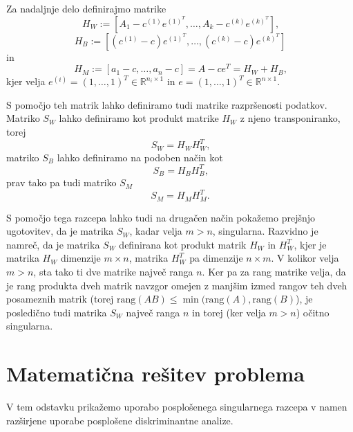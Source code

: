 \documentclass[mat1]{article}
\theoremstyle{definition}
\begin{document}
Za nadaljnje delo definirajmo matrike\begin{equation} \label{H_W1}
H_W :=\left[A_1 - c^{(1)}e^{(1)^T}, \ldots, A_k - c^{(k)}e^{(k)^T}\right] \text{,}
\end{equation}
\begin{equation} \label{H_B1}
H_B := \left[(c^{(1)} - c)e^{(1)^T}, \ldots,(c^{(k)} - c) e^{(k)^T}\right]
\end{equation}
in
$$H_M := \left[a_1 - c, \ldots, a_n - c\right] = A - ce^T = H_W + H_B\text{,}$$
kjer velja
$e^{(i)} = (1,\ldots, 1) ^T \in \mathbb{R}^{ n_i \times 1 }$ in $e =  (1,\ldots, 1) ^T \in \mathbb{R}^{ n \times 1 }$.

S pomočjo teh matrik lahko definiramo tudi matrike razpršenosti podatkov. Matriko $S_W$ lahko definiramo kot produkt matrike $H_W$ z njeno transponiranko, torej
$$S_W = H_W H_W^T \text{,}$$
matriko $S_B$ lahko definiramo na podoben način kot
$$S_B = H_B H_B^T \text{,}$$
prav tako pa tudi matriko $S_M$
$$S_M = H_M H_M^T \text{.}$$

S pomočjo tega razcepa lahko tudi na drugačen način pokažemo prejšnjo ugotovitev, da je matrika $S_W$, kadar velja $m>n$, singularna. Razvidno je namreč, da je matrika $S_W$ definirana kot produkt matrik $H_W$ in $H_W^T$, kjer je matrika $H_W$ dimenzije $m \times n$, matrika $H_W^T$ pa dimenzije $n \times m$. V kolikor velja $m>n$, sta tako ti dve matrike največ ranga $n$.
Ker pa za rang matrike velja, da je rang produkta dveh matrik navzgor omejen z manjšim izmed rangov teh dveh posameznih matrik (torej $\text{rang}(AB) \leq \min(\text{rang}(A), \text{rang}(B)$), je posledično tudi matrika $S_W$ največ ranga $n$ in torej (ker velja $m > n$) očitno singularna.


\section{Matematična rešitev problema}
V tem odstavku prikažemo uporabo posplošenega singularnega razcepa v namen razširjene uporabe posplošene diskriminantne analize.
 
\end{document}
